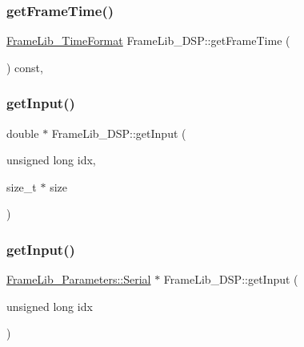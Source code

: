 \mbox{\label{class_frame_lib___d_s_p_a2eedff2474f665b5bf7d2f2fa7a1cdc4}} 
\subsubsection{\texorpdfstring{get\+Frame\+Time()}{getFrameTime()}}
{\footnotesize\ttfamily \hyperlink{_frame_lib___types_8h_a699a4071a9eaaa283906a5ebd0a79ac0}{Frame\+Lib\+\_\+\+Time\+Format} Frame\+Lib\+\_\+\+D\+S\+P\+::get\+Frame\+Time (\begin{DoxyParamCaption}{ }\end{DoxyParamCaption}) const\hspace{0.3cm}{\ttfamily [inline]}, {\ttfamily [protected]}}

\mbox{\label{class_frame_lib___d_s_p_a1d139d046d9269f9f6ac34c8ee8ab516}} 
\subsubsection{\texorpdfstring{get\+Input()}{getInput()}\hspace{0.1cm}{\footnotesize\ttfamily [1/2]}}
{\footnotesize\ttfamily double $\ast$ Frame\+Lib\+\_\+\+D\+S\+P\+::get\+Input (\begin{DoxyParamCaption}\item[{unsigned long}]{idx,  }\item[{size\+\_\+t $\ast$}]{size }\end{DoxyParamCaption})\hspace{0.3cm}{\ttfamily [protected]}}

\mbox{\label{class_frame_lib___d_s_p_a6212469bed2fe6d4a994062bc85db98f}} 
\subsubsection{\texorpdfstring{get\+Input()}{getInput()}\hspace{0.1cm}{\footnotesize\ttfamily [2/2]}}
{\footnotesize\ttfamily \hyperlink{class_frame_lib___parameters_1_1_serial}{Frame\+Lib\+\_\+\+Parameters\+::\+Serial} $\ast$ Frame\+Lib\+\_\+\+D\+S\+P\+::get\+Input (\begin{DoxyParamCaption}\item[{unsigned long}]{idx }\end{DoxyParamCaption})\hspace{0.3cm}{\ttfamily [protected]}}

